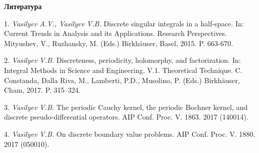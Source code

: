 \smallskip \centerline{\bf Литература}\nopagebreak

1. \foreignlanguage{english}{
	{\it Vasilyev A.V., Vasilyev V.B.} Discrete singular integrals in a half-space. In:
             Current Trends in Analysis and its Applications. Research Perspectives. Mityushev, V., Ruzhansky, M. (Eds.) Birkh\"auser, Basel, 2015. P. 663-670.
}

2. \foreignlanguage{english}{
	{\it	Vasilyev V.B.} Discreteness, periodicity, holomorphy, and factorization. In: Integral Methods in Science and Engineering. V.1. Theoretical Technique.  C. Constanda, Dalla Riva, M., Lamberti, P.D., Musolino, P. (Eds.)  Birkh\"auser, Cham, 2017. P. 315--324.
}

3. \foreignlanguage{english}{
	{\it Vasilyev V.B.} The periodic Cauchy kernel, the periodic Bochner kernel, and discrete pseudo-differential operators. AIP Conf. Proc.  V. 1863. 2017 (140014).
}

4. \foreignlanguage{english}{
	{\it Vasilyev V.B.} On discrete boundary value problems. AIP Conf. Proc. V. 1880. 2017 (050010).
}

